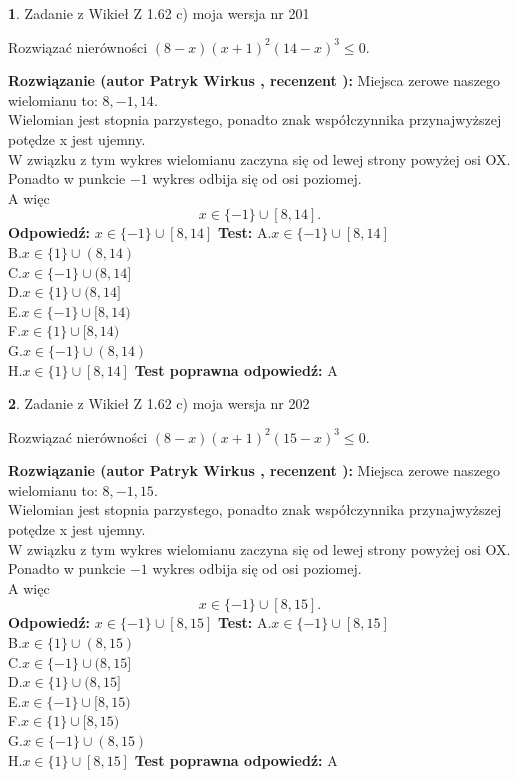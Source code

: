 \documentclass[12pt, a4paper]{article}
\theoremstyle{definition} %
\newtheorem{zad}{}
\newcommand{\zadStart}[1]{\begin{zad}#1\newline}
\newcommand{\zadStop}{\end{zad}}
\newcommand{\rozwStart}[2]{\noindent \textbf{Rozwiązanie (autor #1 , recenzent #2): }\newline}
\newcommand{\rozwStop}{\newline}
\newcommand{\odpStart}{\noindent \textbf{Odpowiedź:}\newline}
\newcommand{\odpStop}{\newline}
\newcommand{\testStart}{\noindent \textbf{Test:}\newline}
\newcommand{\testStop}{\newline}
\newcommand{\kluczStart}{\noindent \textbf{Test poprawna odpowiedź:}\newline}
\newcommand{\kluczStop}{\newline}
\begin{document}
\zadStart{Zadanie z Wikieł Z 1.62 c) moja wersja nr 201}

Rozwiązać nierówności $(8-x)(x+1)^{2}(14-x)^{3}\le0$.
\zadStop
\rozwStart{Patryk Wirkus}{}
Miejsca zerowe naszego wielomianu to: $8, -1, 14$.\\
Wielomian jest stopnia parzystego, ponadto znak współczynnika przy\linebreak najwyższej potędze x jest ujemny.\\ W związku z tym wykres wielomianu zaczyna się od lewej strony powyżej osi OX.\\
Ponadto w punkcie $-1$ wykres odbija się od osi poziomej.\\
A więc $$x \in \{-1\} \cup [8,14].$$
\rozwStop
\odpStart
$x \in \{-1\} \cup [8,14]$
\odpStop
\testStart
A.$x \in \{-1\} \cup [8,14]$\\
B.$x \in \{1\} \cup (8,14)$\\
C.$x \in \{-1\} \cup (8,14]$\\
D.$x \in \{1\} \cup (8,14]$\\
E.$x \in \{-1\} \cup [8,14)$\\
F.$x \in \{1\} \cup [8,14)$\\
G.$x \in \{-1\} \cup (8,14)$\\
H.$x \in \{1\} \cup [8,14]$
\testStop
\kluczStart
A
\kluczStop



\zadStart{Zadanie z Wikieł Z 1.62 c) moja wersja nr 202}

Rozwiązać nierówności $(8-x)(x+1)^{2}(15-x)^{3}\le0$.
\zadStop
\rozwStart{Patryk Wirkus}{}
Miejsca zerowe naszego wielomianu to: $8, -1, 15$.\\
Wielomian jest stopnia parzystego, ponadto znak współczynnika przy\linebreak najwyższej potędze x jest ujemny.\\ W związku z tym wykres wielomianu zaczyna się od lewej strony powyżej osi OX.\\
Ponadto w punkcie $-1$ wykres odbija się od osi poziomej.\\
A więc $$x \in \{-1\} \cup [8,15].$$
\rozwStop
\odpStart
$x \in \{-1\} \cup [8,15]$
\odpStop
\testStart
A.$x \in \{-1\} \cup [8,15]$\\
B.$x \in \{1\} \cup (8,15)$\\
C.$x \in \{-1\} \cup (8,15]$\\
D.$x \in \{1\} \cup (8,15]$\\
E.$x \in \{-1\} \cup [8,15)$\\
F.$x \in \{1\} \cup [8,15)$\\
G.$x \in \{-1\} \cup (8,15)$\\
H.$x \in \{1\} \cup [8,15]$
\testStop
\kluczStart
A
\kluczStop
\end{document}
